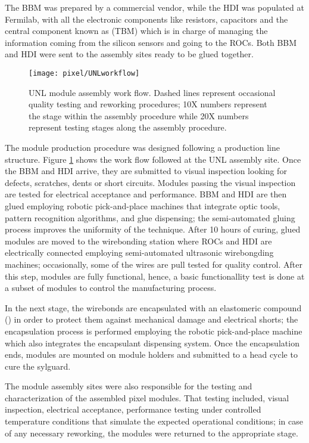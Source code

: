 The BBM was prepared by a commercial vendor, while the HDI was populated at Fermilab, with all the electronic components like resistors, capacitors and the central component known as  (TBM) which is in charge of managing the information coming from the silicon sensors and going to the ROCs. Both BBM and HDI were sent to the assembly sites ready to be glued together.  


\begin{figure}[!h]
  \centering
  \texttt{[image: pixel/UNLworkflow]}
  \caption[UNL module assembly work flow.]{UNL module assembly work flow. Dashed lines represent occasional quality testing and reworking procedures; 10X numbers represent the stage within the assembly procedure while 20X numbers represent testing stages along the assembly procedure.}\label{fig:unlworkflow}
\end{figure}


The module production procedure was designed following a production line structure. Figure \ref{fig:unlworkflow} shows the work flow followed at the UNL assembly site. Once the BBM and HDI arrive, they are submitted to visual inspection looking for defects, scratches, dents or short circuits. Modules passing the visual inspection are tested for electrical acceptance and performance. BBM and HDI are then glued employing robotic pick-and-place machines that integrate optic tools, pattern recognition algorithms, and glue dispensing; the semi-automated gluing process improves the uniformity of the technique. After 10 hours of curing, glued modules are moved to the wirebonding station where ROCs and HDI are electrically connected employing semi-automated ultrasonic wirebongding machines; occasionally, some of the wires are pull tested for quality control. After this step, modules are fully functional, hence, a basic functionallity test is done at a subset of modules to control the manufacturing process.    

In the next stage, the wirebonds are encapsulated with an elastomeric compound () in order to protect them against mechanical damage and electrical shorts; the encapsulation process is performed employing the robotic pick-and-place machine which also integrates the encapsulant dispensing system. Once the encapsulation ends, modules are mounted on module holders and submitted to a head cycle to cure the sylguard.    

The module assembly sites were also responsible for the testing and characterization of the assembled pixel modules. That testing included, visual inspection, electrical acceptance, performance testing under controlled temperature conditions that simulate the expected operational conditions; in case of any necessary reworking, the modules were returned to the appropriate stage.


